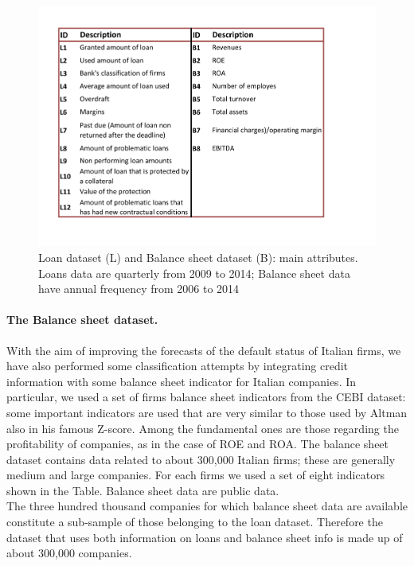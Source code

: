 \begin{figure}[H]
\flushleft
\includegraphics[width=180mm, height=80mm]{figs/Cdataset.pdf}
\caption{Loan dataset (L) and Balance sheet dataset (B): main
attributes. Loans data are quarterly from 2009 to 2014;
Balance sheet data have annual frequency from 2006 to 2014}
\end{figure}


\paragraph{The Balance sheet dataset.}



With the aim of improving the forecasts of the default status of Italian
firms, we have also performed some classification attempts  by
integrating credit information with some balance sheet indicator for Italian
companies. In particular, we used a set of firms balance sheet
indicators from the CEBI dataset: some important indicators are used
that are very similar to those used by Altman
\cite{altman-bankruptcy-17} also  in his famous Z-score. Among the
fundamental ones are those regarding the profitability of companies, as
in the case of ROE and ROA. The balance sheet dataset contains data
related to about 300,000 Italian firms; these are generally medium and
large companies. For each firms we used a set of eight indicators shown
in the Table. Balance sheet data are public data.\\
The three hundred thousand companies for which balance sheet data are available constitute a sub-sample of those belonging to the loan dataset. Therefore the dataset that uses both information on loans and balance sheet info is made up of about 300,000 companies.







